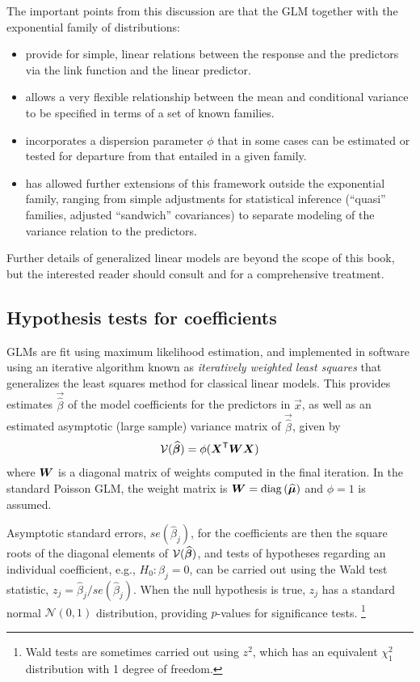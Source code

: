 \documentclass[11pt]{book}\usepackage[]{graphicx}\usepackage[]{color}
\begin{document}
The important points from this discussion are that the GLM together with the exponential
family of distributions:
\begin{itemize}
 \item provide for simple, linear relations between the response and the predictors
 via the link function and the linear predictor.
 \item allows a very flexible relationship between the mean and 
 conditional variance to be specified in terms of a set of known families.
 \item incorporates a dispersion parameter $\phi$ that in some cases can be estimated
 or tested for departure from that entailed in a given family.
 \item has allowed further extensions of this framework outside the exponential family,
 ranging from simple adjustments for statistical inference (``quasi'' families, 
 adjusted ``sandwich'' covariances) to separate modeling of the variance relation
 to the predictors.
\end{itemize}

Further details of generalized linear models are beyond the scope of this book, but
the interested reader should consult \citet[\S 15.3]{Fox:2008} 
and \citet[Ch. 4]{Agresti:2013} for a comprehensive
treatment.

\subsection{Hypothesis tests for coefficients}\label{sec:glm-hyptests}
GLMs are fit using maximum likelihood estimation, and implemented in software using
an iterative algorithm known as \emph{iteratively weighted least squares}
that generalizes the least squares method for classical linear models.
This provides estimates $\vec{\widehat{\beta}}$ of the model coefficients
for the predictors in $\vec{x}$, as well as an estimated asymptotic 
(large sample) variance matrix of $\vec{\widehat{\beta}}$, given by
\begin{equation}\label{eq:varbeta}
\mathcal{V} (\widehat{\bm{\beta}}) = \phi ( \bm{X}^\mathsf{T}  \bm{W} \bm{X} )
\end{equation}
where $\bm{W}$ is a diagonal matrix of weights computed in the final iteration.
In the standard Poisson GLM, the weight matrix is $\bm{W} = \mathrm{diag}\, (\widehat{\bm{\mu}})$
and $\phi=1$ is assumed.

Asymptotic standard errors, $ se (\widehat{\beta}_j)$,
for the coefficients are then the square roots of the
diagonal elements
of $\mathcal{V} (\widehat{\bm{\beta}})$, and tests of hypotheses regarding
an individual coefficient, e.g., $H_0 : \beta_j = 0$, can be carried out
using the Wald test statistic,
$z_j = \widehat{\beta}_j / se (\widehat{\beta}_j)$.
When the null hypothesis is true, $z_j$ has a standard normal $\mathcal{N}(0,1)$
distribution, providing $p$-values for significance tests.%
\footnote{Wald tests are sometimes carried out using $z^2$, which has an equivalent
$\chi^2_1$ distribution with 1 degree of freedom.
}
\end{document}
